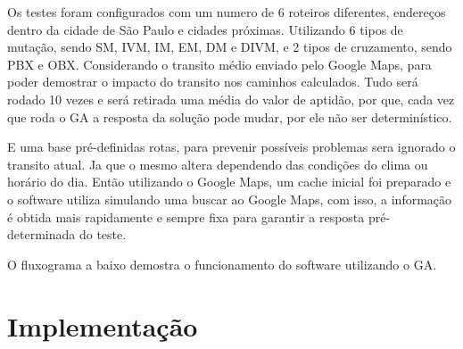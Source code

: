 Os testes foram configurados com um numero de 6 roteiros diferentes, endereços dentro da cidade de São Paulo e cidades próximas. Utilizando 6 tipos de mutação, sendo SM, IVM, IM, EM, DM e DIVM, e 2 tipos de cruzamento, sendo PBX e OBX.
Considerando o transito médio enviado pelo Google Maps, para poder demostrar o impacto do transito nos caminhos calculados.
Tudo será rodado 10 vezes e será retirada uma média do valor de aptidão, por que, cada vez que roda o GA a resposta da solução pode mudar, por ele não ser determinístico.

E uma base pré-definidas rotas, para prevenir possíveis problemas sera ignorado o transito atual. Ja que o mesmo altera dependendo das condições do clima ou horário do dia. Então utilizando o Google Maps, um cache inicial foi preparado e o software utiliza simulando uma buscar ao Google Maps, com isso, a informação é obtida mais rapidamente e sempre fixa para garantir a resposta pré-determinada do teste.

O fluxograma a baixo demostra o funcionamento do software utilizando o GA.

\begin{center}
	\label{fig:FluxoGA}
\end{center}

\chapter{Implementação}
 
